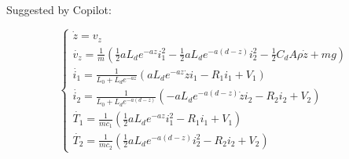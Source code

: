 Suggested by Copilot:

\begin{equation}
    \begin{cases}
        \dot{z} = v_z                                                                                                                                         \\
        \dot{v_z} = \frac{1}{m} \left( \frac{1}{2} a L_d e^{-az} i_1^2 - \frac{1}{2} a L_d e^{-a(d - z)} i_2^2 - \frac{1}{2} C_d A \rho \dot{z} + m g \right) \\
        \dot{i_1} = \frac{1}{L_0 + L_d e^{-az}} \left( a L_d e^{-az} \dot{z} i_1 - R_1 i_1 + V_1 \right)                                                      \\
        \dot{i_2} = \frac{1}{L_0 + L_d e^{-a(d - z)}} \left( -a L_d e^{-a(d - z)} \dot{z} i_2 - R_2 i_2 + V_2 \right)                                         \\
        \dot{T_1} = \frac{1}{m c_1} \left( \frac{1}{2} a L_d e^{-az} i_1^2 - R_1 i_1 + V_1 \right)                                                            \\
        \dot{T_2} = \frac{1}{m c_2} \left( \frac{1}{2} a L_d e^{-a(d - z)} i_2^2 - R_2 i_2 + V_2 \right)
    \end{cases}
\end{equation}